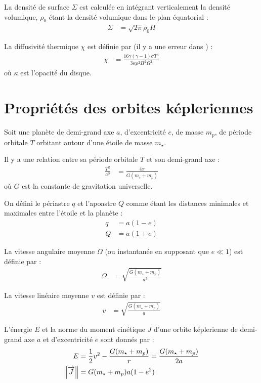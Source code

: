 La densité de surface $\Sigma$ est calculée en intégrant verticalement la densité volumique, $\rho_0$ étant la densité volumique dans le plan équatorial : 
\begin{align}
\Sigma &= \sqrt{2\pi}\rho_0 H
\end{align}

La diffusivité thermique $\chi$ est définie par (il y a une erreur dans \cite[eq. (33)]{paardekooper2011torque}) : 
\begin{align}
\chi &= \frac{16\gamma (\gamma - 1) \sigma T^4}{3\kappa\rho^2H^2\Omega^2}
\end{align}
où $\kappa$ est l'opacité du disque.

\section{Propriétés des orbites képleriennes}
Soit une planète de demi-grand axe $a$, d'excentricité $e$, de masse $m_p$, de période orbitale $T$ orbitant autour d'une étoile de masse $m_\star$. 

Il y a une relation entre sa période orbitale $T$ et son demi-grand axe :
\begin{align}
\frac{T^2}{a^3} &= \frac{4\pi}{G(m_\star + m_p)}
\end{align}
où $G$ est la constante de gravitation universelle.

On défini le périastre $q$ et l'apoastre $Q$ comme étant les distances minimales et maximales entre l'étoile et la planète : 
\begin{subequations}
\begin{align}
q &= a (1 - e)\\
Q &= a (1 + e)
\end{align}
\end{subequations}

La vitesse angulaire moyenne $\Omega$ (ou instantanée en supposant que $e\ll 1$) est définie par : 
\begin{align}
\Omega &= \sqrt{\frac{G(m_\star + m_p)}{a^3}}
\end{align}

La vitesse linéaire moyenne $v$ est définie par : 
\begin{align}
v &= \sqrt{\frac{G(m_\star + m_p)}{a}}
\end{align}

L'énergie $E$ et la norme du moment cinétique $J$ d'une orbite képlerienne de demi-grand axe $a$ et d'excentricité $e$ sont donnés par :
\begin{align}
E &= \frac{1}{2}v^2 - \frac{G(m_\star + m_p)}{r} = \frac{G(m_\star + m_p)}{2a}\\
\left\|{\overrightarrow{J}}\right\| &= G(m_\star + m_p) a (1-e^2)
\end{align}

